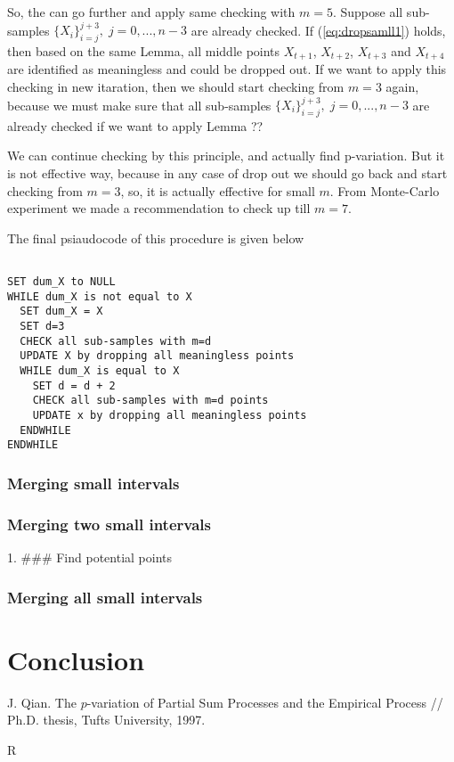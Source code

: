 \documentclass[12pt, a4paper]{article}
\numberwithin{equation}{section}
\begin{document}
So, the can go further and apply same checking with
$m=5$. Suppose all sub-samples
 $\{X_{i}\}_{i=j}^{j+3},\;j=0,...,n-3$ are already 
 checked.
 If (\ref{eq:dropsamll1}) holds, then based on
 the same Lemma, all middle points
$X_{t+1}$, $X_{t+2}$, $X_{t+3}$  and $X_{t+4}$ are  
identified as meaningless and could be dropped out.
If we want to apply this checking in new itaration,
then we should start checking from $m=3$ again, because
we must make sure that all sub-samples
 $\{X_{i}\}_{i=j}^{j+3},\;j=0,...,n-3$ are already 
 checked if we want to apply Lemma ??

We can continue checking by this principle, and actually find 
p-variation. But it is not effective way, because
in any case of drop out we should go back and start checking
from $m=3$, so, it is actually effective for small $m$. From Monte-Carlo experiment we made
a recommendation to check up till $m=7$.

The final psiaudocode of this procedure is given below
\begin{lstlisting}

SET dum_X to NULL
WHILE dum_X is not equal to X
  SET dum_X	= X
  SET d=3
  CHECK all sub-samples with m=d 
  UPDATE X by dropping all meaningless points
  WHILE dum_X is equal to X	
    SET d = d + 2
    CHECK all sub-samples with m=d points
    UPDATE x by dropping all meaningless points
  ENDWHILE  
ENDWHILE

\end{lstlisting}

\subsubsection{Merging small intervals}


\subsubsection{Merging two small intervals}

1. ### Find potential points 




\subsubsection{Merging all small intervals}



\section{Conclusion}
  
\begin{thebibliography}{99}  
   J. Qian. The $p$-variation of Partial Sum Processes
  and the Empirical Process // Ph.D. thesis, Tufts University, 1997.
  
    R
  
\end{thebibliography}
\end{document}
